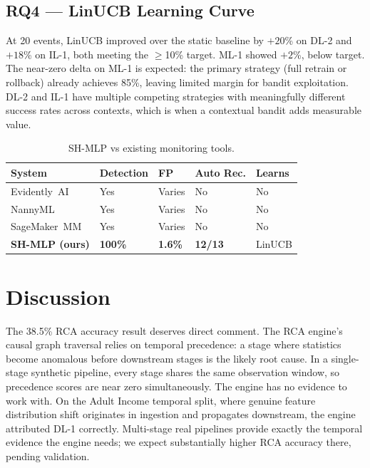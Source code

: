 \documentclass[conference]{IEEEtran}
\begin{document}
\subsection{RQ4 --- LinUCB Learning Curve}

At 20 events, LinUCB improved over the static baseline by $+20$\% on DL-2
and $+18$\% on IL-1, both meeting the $\geq$10\% target. ML-1 showed $+2$\%,
below target. The near-zero delta on ML-1 is expected: the primary strategy
(full retrain or rollback) already achieves 85\%, leaving limited margin for
bandit exploitation. DL-2 and IL-1 have multiple competing strategies with
meaningfully different success rates across contexts, which is when a
contextual bandit adds measurable value.

\begin{table}[h]
\caption{SH-MLP vs existing monitoring tools.}
\label{tab:comparison}
\centering
\setlength{\tabcolsep}{3pt}
\renewcommand{\arraystretch}{1.05}
\begin{tabular}{C{1.6cm}C{1.4cm}C{0.9cm}C{1.3cm}C{0.7cm}}
\toprule
\textbf{System} & \textbf{Detection} & \textbf{FP} &
  \textbf{Auto Rec.} & \textbf{Learns} \\
\midrule
Evidently~AI~\cite{evidently}   & Yes & Varies & \textcolor{RedText}{No}  & No \\
NannyML~\cite{nannynml}         & Yes & Varies & \textcolor{RedText}{No}  & No \\
SageMaker~MM~\cite{sagemaker}   & Yes & Varies & \textcolor{RedText}{No}  & No \\
\textbf{SH-MLP (ours)} & \textbf{100\%} & \textbf{1.6\%} & \textcolor{GreenText}{\textbf{12/13}} & LinUCB \\
\bottomrule
\end{tabular}
\end{table}

\section{Discussion}

The 38.5\% RCA accuracy result deserves direct comment. The RCA engine's
causal graph traversal relies on temporal precedence: a stage where statistics
become anomalous before downstream stages is the likely root cause. In a
single-stage synthetic pipeline, every stage shares the same observation window,
so precedence scores are near zero simultaneously. The engine has no evidence
to work with. On the Adult Income temporal split, where genuine feature
distribution shift originates in ingestion and propagates downstream, the
engine attributed DL-1 correctly. Multi-stage real pipelines provide exactly
the temporal evidence the engine needs; we expect substantially higher RCA
accuracy there, pending validation.
\end{document}
